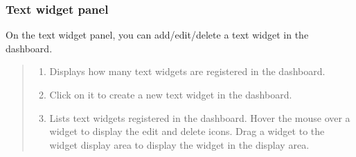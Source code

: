 \documentclass[letterpaper,10pt,english]{sphinxmanual}
\begin{document}
\subsubsection{Text widget panel}
\label{\detokenize{discovery/part04/change_dashboard_layout_and_size:id4}}
On the text widget panel, you can add/edit/delete a text widget in the dashboard.
\begin{quote}

\begin{figure}[H]
\centering

\noindent{}
\end{figure}
\begin{enumerate}
\def\theenumi{\arabic{enumi}}
\def\labelenumi{\theenumi .}
\makeatletter\def\p@enumii{\p@enumi \theenumi .}\makeatother
\item {} 
 Displays how many text widgets are registered in the dashboard.

\item {} 
 Click on it to create a new text widget in the dashboard.

\item {} 
 Lists text widgets registered in the dashboard. Hover the mouse over a widget to display the edit and delete icons. Drag a widget to the widget display area to display the widget in the display area.

\end{enumerate}
\end{quote}
\end{document}

